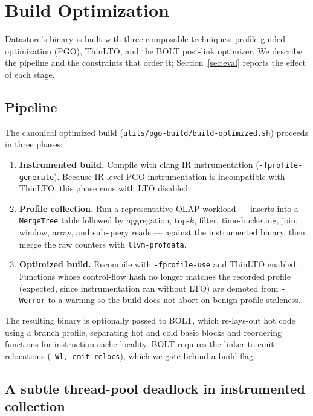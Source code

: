 \section{Build Optimization}
\label{sec:build}

Datastore's binary is built with three composable techniques: profile-guided
optimization (PGO), ThinLTO, and the BOLT post-link optimizer. We describe the
pipeline and the constraints that order it; Section~\ref{sec:eval} reports the
effect of each stage.

\subsection{Pipeline}

The canonical optimized build (\texttt{utils/pgo-build/build-optimized.sh})
proceeds in three phases:

\begin{enumerate}[leftmargin=1.5em]
  \item \textbf{Instrumented build.} Compile with clang IR instrumentation
  (\texttt{-fprofile-generate}). Because IR-level PGO instrumentation is
  incompatible with ThinLTO, this phase runs with LTO disabled.
  \item \textbf{Profile collection.} Run a representative OLAP workload ---
  inserts into a \texttt{MergeTree} table followed by aggregation, top-$k$,
  filter, time-bucketing, join, window, array, and sub-query reads --- against
  the instrumented binary, then merge the raw counters with
  \texttt{llvm-profdata}.
  \item \textbf{Optimized build.} Recompile with \texttt{-fprofile-use} and
  ThinLTO enabled. Functions whose control-flow hash no longer matches the
  recorded profile (expected, since instrumentation ran without LTO) are
  demoted from \texttt{-Werror} to a warning so the build does not abort on
  benign profile staleness.
\end{enumerate}

The resulting binary is optionally passed to BOLT, which re-lays-out hot code
using a branch profile, separating hot and cold basic blocks and reordering
functions for instruction-cache locality. BOLT requires the linker to emit
relocations (\texttt{-Wl,--emit-relocs}), which we gate behind a build flag.

\subsection{A subtle thread-pool deadlock in instrumented collection}

